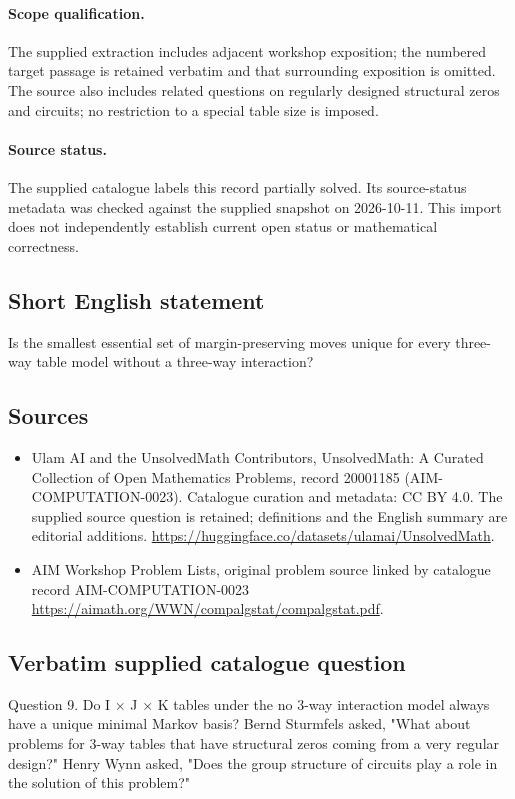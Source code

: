 \documentclass[11pt]{article}
\begin{document}
\paragraph{Scope qualification.}
The supplied extraction includes adjacent workshop exposition; the numbered target passage is retained verbatim and that surrounding exposition is omitted. The source also includes related questions on regularly designed structural zeros and circuits; no restriction to a special table size is imposed.
\paragraph{Source status.}
The supplied catalogue labels this record partially solved. Its source-status metadata was checked against the supplied snapshot on 2026-10-11. This import does not independently establish current open status or mathematical correctness.
\subsection{Short English statement}
Is the smallest essential set of margin-preserving moves unique for every three-way table model without a three-way interaction?
\subsection{Sources}
\begin{itemize}
\item[S1] Ulam AI and the UnsolvedMath Contributors, UnsolvedMath: A Curated Collection of Open Mathematics Problems, record 20001185 (AIM-COMPUTATION-0023). Catalogue curation and metadata: CC BY 4.0. The supplied source question is retained; definitions and the English summary are editorial additions.
\url{https://huggingface.co/datasets/ulamai/UnsolvedMath}.
\item[S2] AIM Workshop Problem Lists, original problem source linked by catalogue record AIM-COMPUTATION-0023
\url{https://aimath.org/WWN/compalgstat/compalgstat.pdf}.
\end{itemize}
\subsection{Verbatim supplied catalogue question}
Question 9. Do I × J × K tables under the no 3-way interaction model always have a unique minimal Markov basis? Bernd Sturmfels asked, "What about problems for 3-way tables that have structural zeros coming from a very regular design?" Henry Wynn asked, "Does the group structure of circuits play a role in the solution of this problem?"
\end{document}
